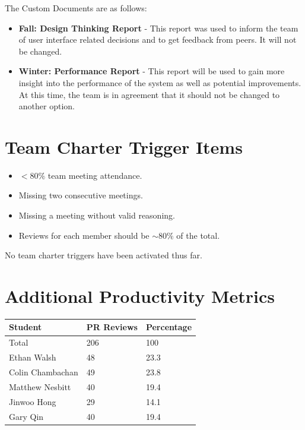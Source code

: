 \documentclass{article}
\begin{document}
The Custom Documents are as follows:

\begin{itemize}
    \item \textbf{Fall: Design Thinking Report} - This report was used to inform the team of user interface related decisions and to get feedback from peers. It will not be changed.
    \item \textbf{Winter: Performance Report} - This report will be used to gain more insight into the performance of the system as well as potential improvements. At this time, the team is in agreement
    that it should not be changed to another option.
\end{itemize}

\section{Team Charter Trigger Items}

\begin{itemize}
	\item $< 80\%$ team meeting attendance.
	\item Missing two consecutive meetings.
	\item Missing a meeting without valid reasoning.
	\item Reviews for each member should be $\sim80\%$ of the total.
\end{itemize}

\noindent No team charter triggers have been activated thus far.

\section{Additional Productivity Metrics}

\begin{table}[H]
\centering
\begin{tabular}{lll}
\toprule
\textbf{Student} & \textbf{PR Reviews} & \textbf{Percentage}\\
\midrule
Total & 206 & 100\\
Ethan Walsh & 48 & 23.3\\
Colin Chambachan & 49 & 23.8\\
Matthew Nesbitt & 40 & 19.4\\
Jinwoo Hong & 29 & 14.1\\
Gary Qin & 40 & 19.4\\
\bottomrule
\end{tabular}
\end{table}
\end{document}
